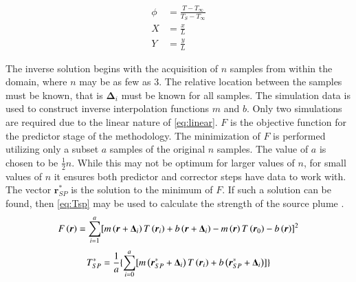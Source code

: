 \documentclass[preprint,12pt]{elsarticle}
\newcommand{\bv}[1]{\boldsymbol #1}  %
\begin{document}
\begin{subequations}
\label{eq:normalize}
\begin{align}
\phi &= \frac{T-T_{\infty}}{T_S-T_{\infty}} \\
X &= \frac{x}{L} \\
Y &= \frac{y}{L} 
\end{align}
\end{subequations}


The inverse solution begins with the acquisition of $n$ samples from within the domain, where $n$ may be as few as 3.  The relative location between the samples must be known, that is $\bv{\Delta_i}$ must be known for all samples.  The simulation data is used to construct inverse interpolation functions $m$ and $b$.  Only two simulations are required due to the linear nature of \cref{eq:linear}.  $F$ is the objective function for the predictor stage of the methodology.  The minimization of $F$ is performed utilizing only a subset $a$ samples of the original $n$ samples.  The value of $a$ is chosen to be $\frac{1}{2}n$. While this may not be optimum for larger values of $n$, for small values of $n$ it ensures both predictor and corrector steps have data to work with.  The vector $\bv{r^{\ast}_{SP}}$ is the solution to the minimum of $F$.  If such a solution can be found, then \cref{eq:Tsp} may be used to calculate the strength of the source plume \cite{ijhmt1} .
%
\begin{equation}
\centering
F\left( \bv r \right) =  \sum^{a}_{i=1} [ m\left( \bv r + \bv{\Delta_i}  \right) T\left( \bv{r_i} \right) +b\left( \bv r + \bv{\Delta_i} \right) -m\left( \bv r \right) T\left( \bv{r_0} \right) - b\left( \bv r \right) ]^2  
\label{eq:F}
\end{equation}
%
\begin{equation}
\centering
T^{\ast}_{SP} = \frac{1}{a} \{ \sum^{a}_{i=0} [ m\left( \bv{r^{\ast}_{SP}}+ \bv{\Delta_i}  \right) T\left( \bv{r_i} \right)  + b\left( \bv{r^{\ast}_{SP}}+ \bv{\Delta_i} \right) ] \}
\label{eq:Tsp}
\end{equation}
\end{document}
